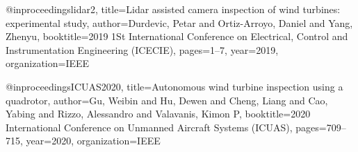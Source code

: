 \begin{thebibliography}{9}
@inproceedings{lidar2,
  title={Lidar assisted camera inspection of wind turbines: experimental study},
  author={Durdevic, Petar and Ortiz-Arroyo, Daniel and Yang, Zhenyu},
  booktitle={2019 1St International Conference on Electrical, Control and Instrumentation Engineering (ICECIE)},
  pages={1--7},
  year={2019},
  organization={IEEE}
}

@inproceedings{ICUAS2020,
  title={Autonomous wind turbine inspection using a quadrotor},
  author={Gu, Weibin and Hu, Dewen and Cheng, Liang and Cao, Yabing and Rizzo, Alessandro and Valavanis, Kimon P},
  booktitle={2020 International Conference on Unmanned Aircraft Systems (ICUAS)},
  pages={709--715},
  year={2020},
  organization={IEEE}
}





\end{thebibliography}


